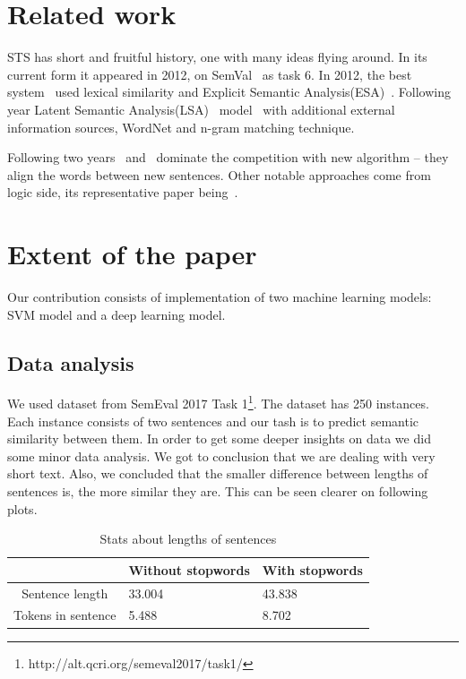 \documentclass[10pt, a4paper]{article}
\begin{document}
\begin{table}[h!]
\section{Related work}

STS has short and fruitful history, one with many ideas flying around. In its current form it appeared in 2012, on SemVal~\citep{agirre2012semeval} as task 6.  In 2012, the best system~\citep{bar2012ukp} used lexical similarity and Explicit Semantic Analysis(ESA)~\citep{gabrilovich2007computing}. Following year Latent Semantic Analysis(LSA)~\citep{deerwester1990indexing} model~\citep{han2013umbc} with additional external information sources, WordNet and n-gram matching technique.

Following two years~\citep{sultan2014dls} and~\citep{sultan2015dls} dominate the competition with new algorithm -- they align the words between new sentences. Other notable approaches come from logic side, its representative paper being~\citep{beltagy2014probabilistic}.

\section{Extent of the paper}

Our contribution consists of implementation of two machine learning models: SVM model and a deep learning model.

\subsection{Data analysis}
We used dataset from SemEval 2017
Task 1\footnote{http://alt.qcri.org/semeval2017/task1/}.
The dataset has 250 instances. Each instance consists of two sentences and our tash is to predict semantic similarity between them. In order to get some deeper insights on data we did some minor data analysis. We got to conclusion that we are dealing with very short text. Also, we concluded that the smaller difference between lengths of sentences is, the more similar they are. This can be seen clearer on following plots.

\begin{table}
\caption{Stats about lengths of sentences}
\label{tab:narrow-table}
\begin{center}
\begin{tabular}{cll}
\toprule
& Without stopwords & With stopwords \\
\midrule
Sentence length & 33.004 & 43.838 \\
Tokens in sentence & 5.488 & 8.702 \\
\bottomrule
\end{tabular}
\end{center}
\end{table}


\end{table}
\end{document}
